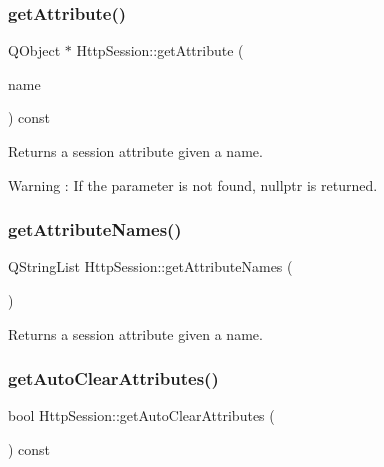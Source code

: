 \subsubsection{\texorpdfstring{get\+Attribute()}{getAttribute()}}
{\footnotesize\ttfamily Q\+Object $\ast$ Http\+Session\+::get\+Attribute (\begin{DoxyParamCaption}\item[{const Q\+String \&}]{name }\end{DoxyParamCaption}) const}



Returns a session attribute given a name. 

\begin{DoxyWarning}{Warning}
\+: If the parameter is not found, nullptr is returned. 
\end{DoxyWarning}
\mbox{\label{class_http_session_aca7b24bde0466a8140c30f6642c8dfc4}} 
\subsubsection{\texorpdfstring{get\+Attribute\+Names()}{getAttributeNames()}}
{\footnotesize\ttfamily Q\+String\+List Http\+Session\+::get\+Attribute\+Names (\begin{DoxyParamCaption}{ }\end{DoxyParamCaption})}



Returns a session attribute given a name. 

\mbox{\label{class_http_session_a0bb33f4c387b07264245de390984be10}} 
\subsubsection{\texorpdfstring{get\+Auto\+Clear\+Attributes()}{getAutoClearAttributes()}}
{\footnotesize\ttfamily bool Http\+Session\+::get\+Auto\+Clear\+Attributes (\begin{DoxyParamCaption}{ }\end{DoxyParamCaption}) const}



